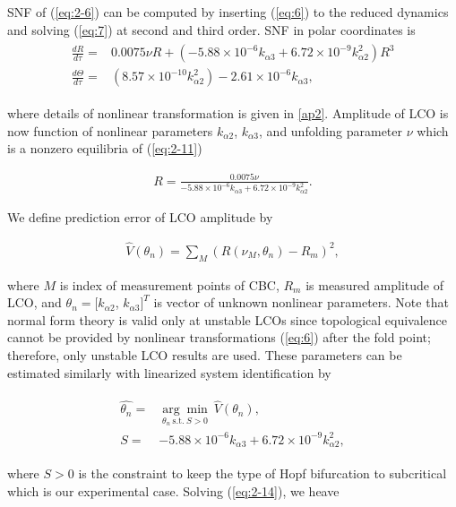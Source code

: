 \documentclass[openacc]{rsproca_new}%
\newcommand{\Eref}[1]{(\ref{#1})}
\begin{document}
SNF of \Eref{eq:2-6} can be computed by inserting \Eref{eq:6} to the reduced dynamics and solving \Eref{eq:7} at second and third order. SNF in polar coordinates is
\begin{align}\label{eq:2-11}
\begin{split}
\frac{dR}{d\tau}=&0.0075\nu R+(- 5.88 \times 10^{-6}  k_{\alpha 3} + 6.72 \times 10^{-9} k_{\alpha 2}^2)R^3\\
\frac{d\Theta}{d\tau}=&(8.57 \times 10^{-10}  k_{\alpha 2}^2) - 2.61 \times 10^{-6}k_{\alpha 3},
\end{split}
\end{align}

\noindent where details of nonlinear transformation is given in \ref{ap2}. Amplitude of LCO is now function of nonlinear parameters $k_{\alpha2}$, $k_{\alpha3}$, and unfolding parameter $\nu$ which is a nonzero equilibria of \Eref{eq:2-11}

\begin{align}\label{eq:2-12}
R=\frac{0.0075\nu}{- 5.88 \times 10^{-6}  k_{\alpha 3} + 6.72 \times 10^{-9} k_{\alpha 2}^2}.
\end{align}

\noindent We define prediction error of LCO amplitude by

\begin{align}\label{eq:2-13}
\hat{V}(\theta_n)=\sum_M (R(\nu_M,\theta_n)-R_m)^2,
\end{align}

\noindent where $M$ is index of measurement points of CBC, $R_m$ is measured amplitude of LCO, and $\theta_n=[k_{\alpha2}$, $k_{\alpha3}]^T$ is vector of unknown nonlinear parameters. Note that normal form theory is valid only at unstable LCOs since topological equivalence cannot be provided by nonlinear transformations \Eref{eq:6} after the fold point; therefore, only unstable LCO results are used. These parameters can be estimated similarly with linearized system identification by

\begin{align}\label{eq:2-14}
\begin{split}
\hat{\theta_n}=&\underset{\theta_n \: \textrm{s.t.} \: S>0} {\arg\min} \: \hat V(\theta_n),\\
S=&- 5.88 \times 10^{-6}  k_{\alpha 3} + 6.72 \times 10^{-9} k_{\alpha 2}^2,
\end{split}
\end{align}

\noindent where $S>0$ is the constraint to keep the type of Hopf bifurcation to subcritical which is our experimental case. Solving \Eref{eq:2-14}, we heave
\end{document}
